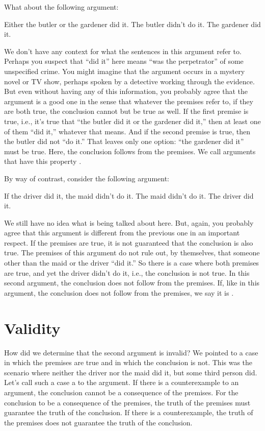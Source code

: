 What about the following argument:
\begin{earg}
	\prem Either the butler or the gardener did it.
	\prem The butler didn't do it.
	\conc The gardener did it.
\end{earg}
We don't have any context for what the sentences in this argument refer to. Perhaps you suspect that ``did it'' here means ``was the perpetrator'' of some unspecified crime. You might imagine that the argument occurs in a mystery novel or TV show, perhaps spoken by a detective working through the evidence. But even without having any of this information, you probably agree that the argument is a good one in the sense that whatever the premises refer to, if they are both true, the conclusion cannot but be true as well. If the first premise is true, i.e., it's true that ``the butler did it or the gardener did it,'' then at least one of them ``did it,'' whatever that means. And if the second premise is true, then the butler did not ``do it.'' That leaves only one option: ``the gardener did it'' must be true. Here, the conclusion follows from the premises. We call arguments that have this property .

By way of contrast, consider the following argument:
\begin{earg}\label{argMaidDriver}
	\prem If the driver did it, the maid didn't do it.
	\prem The maid didn't do it.
	\conc The driver did it.
\end{earg}
We still have no idea what is being talked about here. But, again, you probably agree that this argument is different from the previous one in an important respect. If the premises are true, it is not guaranteed that the conclusion is also true. The premises of this argument do not rule out, by themselves, that someone other than the maid or the driver ``did it.'' So there is a case where both premises are true, and yet the driver didn't do it, i.e., the conclusion is not true. In this second argument, the conclusion does not follow from the premises. If, like in this argument, the conclusion does not follow from the premises, we say it is .


\section{Validity}
How did we determine that the second argument is invalid? We pointed to a case in which the premises are true and in which the conclusion is not.  This was the scenario where neither the driver nor the maid did it, but some third person did.  Let's call such a case a  to the argument. If there is a counterexample to an argument, the conclusion cannot be a consequence of the premises. For the conclusion to be a consequence of the premises, the truth of the premises must guarantee the truth of the conclusion. If there is a counterexample, the truth of the premises does not guarantee the truth of the conclusion.

